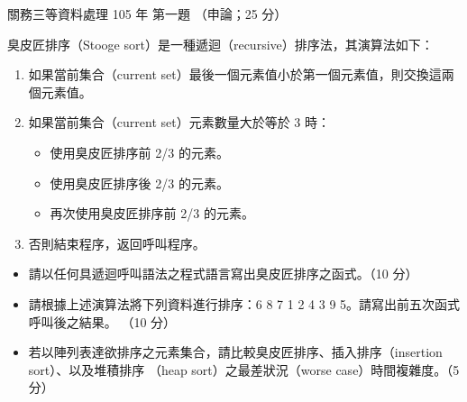 \begin{pastexam}[label={px:gw3-105-ds-01}]{關務三等資料處理 105 年 第一題}
（申論；25 分）

臭皮匠排序（Stooge sort）是一種遞迴（recursive）排序法，其演算法如下：
\begin{enumerate}[label=\textit{\arabic*.}, leftmargin=2.2em, itemsep=1pt]
\item 如果當前集合（current set）最後一個元素值小於第一個元素值，則交換這兩個元素值。
\item 如果當前集合（current set）元素數量大於等於 3 時：
\begin{itemize}[leftmargin=2em, labelsep=0.3em, itemsep=0pt]
\item[⑴] 使用臭皮匠排序前 2/3 的元素。
\item[⑵] 使用臭皮匠排序後 2/3 的元素。
\item[⑶] 再次使用臭皮匠排序前 2/3 的元素。
\end{itemize}
\item 否則結束程序，返回呼叫程序。
\end{enumerate}
\begin{itemize}[leftmargin=2em, labelsep=0.3em, itemsep=2pt]
\item[㈠] 請以任何具遞迴呼叫語法之程式語言寫出臭皮匠排序之函式。（10 分）
\item[㈡] 請根據上述演算法將下列資料進行排序：6 8 7 1 2 4 3 9 5。請寫出前五次函式呼叫後之結果。
（10 分）
\item[㈢] 若以陣列表達欲排序之元素集合，請比較臭皮匠排序、插入排序（insertion sort）、以及堆積排序
（heap sort）之最差狀況（worse case）時間複雜度。（5 分）
\end{itemize}
\end{pastexam}

